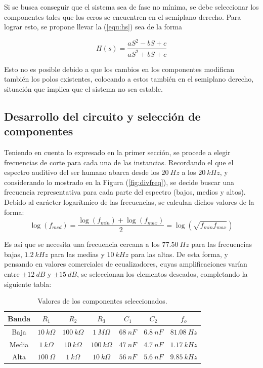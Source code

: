 Si se busca conseguir que el sistema sea de fase no mínima, se debe seleccionar los componentes tales que los ceros se encuentren en el semiplano derecho. Para lograr esto, se propone llevar la (\ref{equ:hs}) sea de la forma

\begin{equation*}
	H(s) = \frac{a S^2 - b S + c}{a S^2 + b S + c}
\end{equation*}

Esto no es posible debido a que los cambios en los componentes modifican también los polos existentes, colocando a estos también en el semiplano derecho, situación que implica que el sistema no sea estable. 

\subsection{Desarrollo del circuito y selección de componentes}
\label{sub:desarrollo}

Teniendo en cuenta lo expresado en la primer sección, se procede a elegir frecuencias de corte para cada una de las instancias. Recordando el que el espectro auditivo del ser humano abarca desde los $20 \ Hz$ a los $20 \ kHz$, y considerando lo mostrado en la Figura (\ref{fig:divfreq}), se decide buscar una frecuencia representativa para cada parte del espectro (bajos, medios y altos). Debido al carácter logarítmico de las frecuencias, se calculan dichos valores de la forma:
\begin{equation*}
	\log{(f_{med})} = \frac{\log(f_{min}) + \log(f_{max})}{2} = \log(\sqrt{f_{min} f_{max}})
\end{equation*}

Es así que se necesita una frecuencia cercana a los $77.50 \ Hz$ para las frecuencias bajas, $1.2 \ kHz$ para las medias y $10 \ kHz$ para las altas. De esta forma, y pensando en valores comerciales de ecualizadores, cuyas amplificaciones varían entre $\pm 12 \ dB$ y $\pm 15 \ dB$, se seleccionan los elementos deseados, completando la siguiente tabla:

\begin{table}[H]
\begin{center}
\begin{tabular}{ccccccc}
\hline
Banda & $R_1$ & $R_2$ & $R_3$ & $C_1$ & $C_2$ & $f_o$ \\
\hline
Baja & $10 \ k\Omega$ & $100 \ k\Omega$ & $1 \ M\Omega$ & $68 \ nF$ & $6.8 \ nF$ & $81.08 \ Hz$ \\
Media & $1 \ k\Omega$ & $10 \ k\Omega$ & $100 \ k\Omega$ & $47 \ nF$ & $4.7 \ nF$ & $1.17 \ kHz$ \\
Alta & $100 \ \Omega$ & $1 \ k\Omega$ & $10 \ k\Omega$ & $56 \ nF$ & $5.6 \ nF$ & $9.85 \ kHz$\\
\hline
\end{tabular}
\caption{Valores de los componentes seleccionados.}
\label{tabla:valores}
\end{center}
\end{table}

